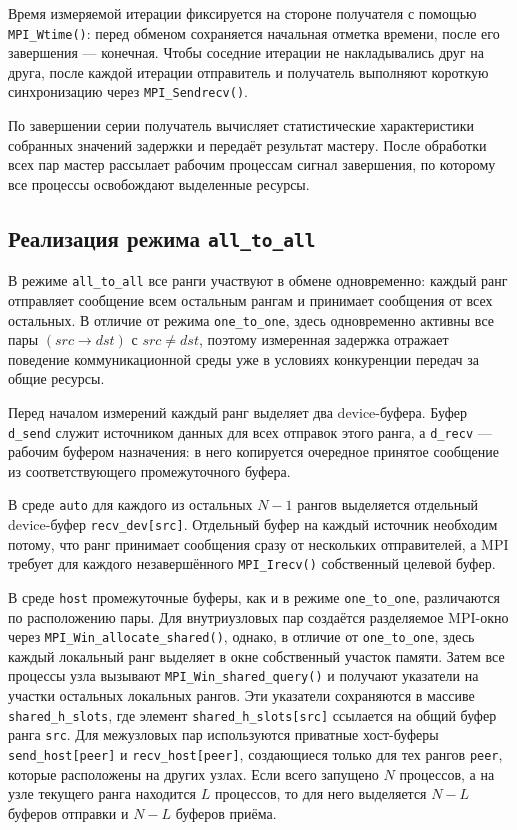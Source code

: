 \documentclass[a4paper,14pt]{extarticle}
\begin{document}
Время измеряемой итерации фиксируется на стороне получателя с помощью \texttt{MPI\_Wtime()}: перед обменом сохраняется начальная отметка времени, после его завершения --- конечная. Чтобы соседние итерации не накладывались друг на друга, после каждой итерации отправитель и получатель выполняют короткую синхронизацию через \texttt{MPI\_Sendrecv()}.
 
По завершении серии получатель вычисляет статистические характеристики собранных значений задержки и передаёт результат мастеру. После обработки всех пар мастер рассылает рабочим процессам сигнал завершения, по которому все процессы освобождают выделенные ресурсы.
 
\subsection{Реализация режима \texttt{all\_to\_all}}
\label{sec:all-to-all-impl}
 
В режиме \texttt{all\_to\_all} все ранги участвуют в обмене одновременно: каждый ранг отправляет сообщение всем остальным рангам и принимает сообщения от всех остальных. В отличие от режима \texttt{one\_to\_one}, здесь одновременно активны все пары \((src \rightarrow dst)\) с \(src \ne dst\), поэтому измеренная задержка отражает поведение коммуникационной среды уже в условиях конкуренции передач за общие ресурсы.
 
Перед началом измерений каждый ранг выделяет два device-буфера. Буфер \texttt{d\_send} служит источником данных для всех отправок этого ранга, а \texttt{d\_recv} --- рабочим буфером назначения: в него копируется очередное принятое сообщение из соответствующего промежуточного буфера.
 
В среде \texttt{auto} для каждого из остальных \(N-1\) рангов выделяется отдельный device-буфер \texttt{recv\_dev[src]}. Отдельный буфер на каждый источник необходим потому, что ранг принимает сообщения сразу от нескольких отправителей, а MPI требует для каждого незавершённого \texttt{MPI\_Irecv()} собственный целевой буфер.
 
В среде \texttt{host} промежуточные буферы, как и в режиме \texttt{one\_to\_one}, различаются по расположению пары. Для внутриузловых пар создаётся разделяемое MPI-окно через \texttt{MPI\_Win\_allocate\_shared()}, однако, в отличие от \texttt{one\_to\_one}, здесь каждый локальный ранг выделяет в окне собственный участок памяти. Затем все процессы узла вызывают \texttt{MPI\_Win\_shared\_query()} и получают указатели на участки остальных локальных рангов. Эти указатели сохраняются в массиве \texttt{shared\_h\_slots}, где элемент \texttt{shared\_h\_slots[src]} ссылается на общий буфер ранга \texttt{src}. Для межузловых пар используются приватные хост-буферы \texttt{send\_host[peer]} и \texttt{recv\_host[peer]}, создающиеся только для тех рангов \texttt{peer}, которые расположены на других узлах. Если всего запущено \(N\) процессов, а на узле текущего ранга находится \(L\) процессов, то для него выделяется \(N-L\) буферов отправки и \(N-L\) буферов приёма.
 
\end{document}
